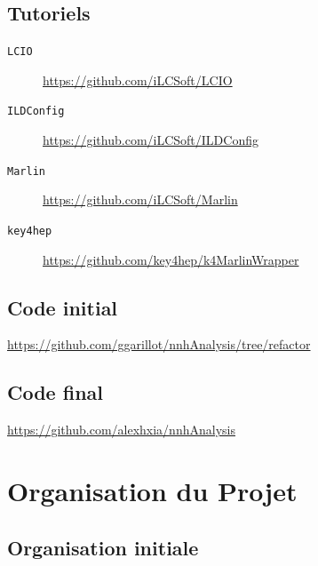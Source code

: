 \documentclass[10pt,a4paper]{report}
\newcommand{\minidstmarker}{\texttt{miniDSTMaker}\xspace}
\newcommand{\processor}{\texttt{processor}\xspace}
\newcommand{\analysis}{\texttt{analysis}\xspace}
\begin{document}
\begin{appendix}
\section{Tutoriels}

\begin{description}
	\item[\texttt{LCIO}] \url{https://github.com/iLCSoft/LCIO}
	\item[\texttt{ILDConfig}] \url{https://github.com/iLCSoft/ILDConfig}
	\item[\texttt{Marlin}] \url{https://github.com/iLCSoft/Marlin}
	\item[\texttt{key4hep}] \url{https://github.com/key4hep/k4MarlinWrapper}
\end{description}

\section{Code initial}

\url{https://github.com/ggarillot/nnhAnalysis/tree/refactor}

\section{Code final}

\url{https://github.com/alexhxia/nnhAnalysis}


\chapter{Organisation du Projet}

\section{Organisation initiale}

\begin{figure}[h!]
	\center
\end{figure}
\end{appendix}
\end{document}
